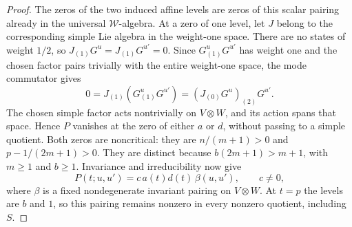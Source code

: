 \documentclass[11pt,a4paper]{amsart}
\numberwithin{equation}{section}
\theoremstyle{definition}
\theoremstyle{remark}
\begin{document}
\begin{proof}
The zeros of the two induced affine levels are zeros of this scalar pairing
already in the universal $\mathcal W$-algebra. At a zero of one level,
let $J$ belong to the corresponding simple Lie algebra in the weight-one space. There are no states of
weight $1/2$, so $J_{(1)}G^u=J_{(1)}G^{u'}=0$.
Since $G^u_{(1)}G^{u'}$ has weight one and the chosen factor pairs
trivially with the entire weight-one space, the mode commutator gives
$$
 0=J_{(1)}(G^u_{(1)}G^{u'})
   =(J_{(0)}G^u)_{(2)}G^{u'}.
$$
The chosen simple factor acts nontrivially on $V\otimes W$, and
its action spans that space. Hence $P$ vanishes at the zero of
either $a$ or $d$, without passing to a simple quotient.
Both zeros are noncritical: they are $n/(m+1)>0$ and
$p-1/(2m+1)>0$. They are distinct because
$b(2m+1)>m+1$, with $m\ge1$ and $b\ge1$.
Invariance and irreducibility now give
$$
 P(t;u,u')=c\,a(t)d(t)\,\beta(u,u'),\qquad c\ne0,
$$
where $\beta$ is a fixed nondegenerate invariant pairing on
$V\otimes W$. At $t=p$ the levels are $b$ and $1$, so this
pairing remains nonzero in every nonzero quotient, including $S$.

\end{proof}
\end{document}
